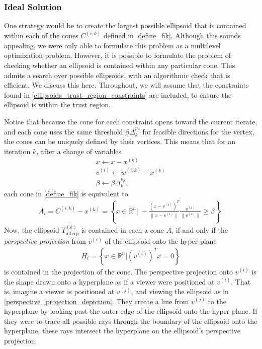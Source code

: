 \documentclass{article}
\theoremstyle{case}
\numberwithin{theorem}{subsection}
\newcommand{\ck}{{c^{(k)}}}
\newcommand{\dk}{\Delta_k}
\newcommand{\qk}{{Q^{(k)}}}
\newcommand{\Rn}{\mathbb R^n}
\newcommand{\sampletrk}{{T_{\text{interp}}^{(k)}}}
\newcommand{\sk}{{{s}^{(k)}}}
\newcommand{\wik}{{w^{(i, k)}}}
\newcommand{\xk}{x^{(k)}}
\newcommand{\fik}{{C^{(i, k)}}}
\begin{document}
\subsubsection{Ideal Solution}
\label{ideal_ellipsoid_in_polyhedron}

One strategy would be to create the largest possible ellipsoid that is contained within each of the cones $\fik$ defined in \cref{define_fik}.
Although this sounds appealing, we were only able to formulate this problem as a multilevel optimization problem.
However, it is possible to formulate the problem of checking whether an ellipsoid is contained within any particular cone.
This admits a search over possible ellipsoids, with an algorithmic check that is efficient.
We discuss this here.
Throughout, we will assume that the constraints found in \cref{ellipsoids_trust_region_constraints} are included, to ensure the ellipsoid is within the trust region.

Notice that because the cone for each constraint opens toward the current iterate,
and each cone uses the same threshold $\beta \dk^{p_\beta}$ for feasible directions for the vertex,
the cones can be uniquely defined by their vertices.
This means that for an iteration $k$, after a change of variables
\begin{align}
x \gets x - \xk \\
v^{(i)}  \gets \wik - \xk \\
\beta \gets \beta \dk^{p_{\beta}},
\end{align}
each cone in \cref{define_fik} is equivalent to
\begin{align*}
A_i = \fik - \xk = \left\{x\in\Rn\bigg|\;-\frac{(x - v^{(i)})^T}{\|x - v^{(i)}\|} \frac{v^{(i)}}{\|v^{(i)}\|} \ge \beta \right\}.
\end{align*}
Now, the ellipsoid $\sampletrk$ is contained in each a cone $A_i$ if and only if the \emph{perspective projection} from $v^{(i)}$ of the ellipsoid onto the hyper-plane 
\begin{align*}
H_i = \left\{x \in \Rn \bigg|\left(v^{(i)}\right)^Tx = 0\right\}
\end{align*}
is contained in the projection of the cone.
The perspective projection onto $v^{(i)}$ is the shape drawn onto a hyperplane as if a viewer were positioned at $v^{(i)}$.
That is, imagine a viewer is positioned at $v^{(j)}$, and viewing the ellipsoid as in \cref{perspective_projection_depiction}.
They create a line from $v^{(j)}$ to the hyperplane by looking past the outer edge of the ellipsoid onto the hyper plane.
If they were to trace all possible rays through the boundary of the ellipsoid onto the hyperplane, 
these rays intersect the hyperplane on the ellipsoid's perspective projection.
\end{document}
